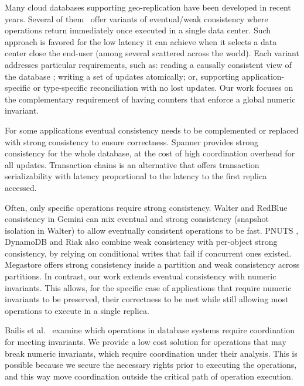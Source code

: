\documentclass[conference]{IEEEtran}
\begin{document}
Many cloud databases supporting geo-replication have been developed in recent years.
Several of them~\cite{dynamo,cops,eiger,chainreaction,cassandra,riak,dynamoDB} offer variants of eventual/weak consistency where operations return immediately once executed in a single data center. Such approach is favored for the low latency it can achieve when it selects a data center close the end-user (among several scattered across the world). Each variant addresses particular requirements, such as: reading a causally consistent view of the database \cite{cops,chainreaction}; writing a set of updates atomically\cite{eiger}; or, supporting application-specific or type-specific reconciliation with no lost updates\cite{dynamo,cops,walter,dynamoDB,riak}.
Our work focuses on the complementary requirement of having counters that enforce a global numeric invariant.

For some applications eventual consistency needs to be complemented or replaced with strong consistency to ensure correctness. Spanner \cite{spanner} provides strong consistency for the whole database, at the cost of high coordination overhead for all updates. Transaction chains \cite{transactionchains} is an alternative that offers transaction serializability with latency proportional to the latency to the first replica accessed. 

Often, only specific operations require strong consistency. Walter \cite{walter} and RedBlue consistency in Gemini \cite{redblue} can mix eventual and strong consistency (snapshot isolation in Walter) to allow eventually consistent operations to be fast. PNUTS \cite{pnuts}, DynamoDB \cite{dynamoDB} and Riak \cite{riak} also combine weak consistency with per-object strong consistency, by relying on conditional writes that fail if concurrent ones existed.
Megastore \cite{megastore} offers strong consistency inside a partition
and weak consistency across partitions. In contrast, our work extends eventual consistency with numeric invariants. This allows, for the specific case of applications that require numeric invariants to be preserved, their correctness to be met while still allowing most operations to execute in a single replica.

Bailis et al.~\cite{coordinationavoiding} examine which operations in database systems require coordination for meeting invariants. 
We provide a low cost solution for operations that may break numeric invariants, which require coordination under their analysis. This is possible because we secure the necessary rights prior to executing the operations, and this way move coordination outside the critical path of operation execution.
\end{document}
